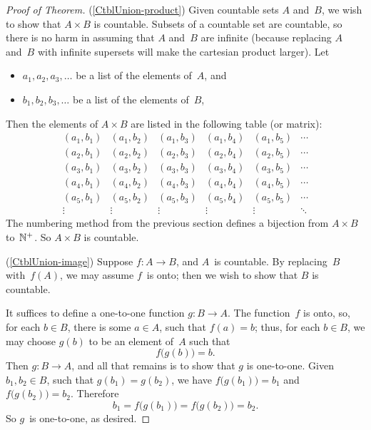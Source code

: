 \documentclass[../MATH-2000-Notes.tex]{subfiles}
\begin{document}
\begin{proof}[Proof of Theorem]
    (\ref{CtblUnion-product}) Given countable sets $A$ and~$B$, we wish to show that $A \times B$ is countable. Subsets of a countable set are countable, so there is no harm in assuming that $A$ and~$B$ are infinite (because replacing $A$ and~$B$ with infinite supersets will make the cartesian product larger). Let
    \begin{itemize}
        \item $a_1,a_2,a_3,\ldots$ be a list of the elements of~$A$,
              and
        \item $b_1,b_2,b_3,\ldots$ be a list of the elements of~$B$,
    \end{itemize}
    Then the elements of $A \times B$ are listed in the following table (or matrix):
    $$\begin{matrix}
            (a_1,b_1) & (a_1,b_2) & (a_1,b_3) & (a_1,b_4) & (a_1,b_5) & \cdots \\
            (a_2,b_1) & (a_2,b_2) & (a_2,b_3) & (a_2,b_4) & (a_2,b_5) & \cdots \\
            (a_3,b_1) & (a_3,b_2) & (a_3,b_3) & (a_3,b_4) & (a_3,b_5) & \cdots \\
            (a_4,b_1) & (a_4,b_2) & (a_4,b_3) & (a_4,b_4) & (a_4,b_5) & \cdots \\
            (a_5,b_1) & (a_5,b_2) & (a_5,b_3) & (a_5,b_4) & (a_5,b_5) & \cdots \\
            \vdots    & \vdots    & \vdots    & \vdots    & \vdots    & \ddots
        \end{matrix}$$
    The numbering method from the previous section defines a bijection from $A \times B$ to~$\mathbb{N}^+$. So $A \times B$ is countable.

    \medskip
    (\ref{CtblUnion-image}) Suppose $f \colon A \to B$, and $A$~is countable. By replacing~$B$ with~$f(A)$, we may assume $f$~is onto; then we wish to show that $B$ is countable.

    It suffices to define a one-to-one function $g \colon B \to A$. The function~$f$ is onto, so, for each $b \in B$, there is some $a \in A$, such that $f(a) = b$; thus, for each $b \in B$, we may choose $g(b)$ to be an element of~$A$ such that
    $$ f \bigl( g(b) \bigr) = b .$$
    Then $g \colon B \to A$, and all that remains is to show that $g$ is one-to-one. Given $b_1,b_2 \in B$, such that $g(b_1) = g(b_2)$, we have $f \bigl( g(b_1) \bigr) = b_1$ and $f \bigl( g(b_2) \bigr) = b_2$. Therefore
    $$ b_1 = f \bigl( g(b_1) \bigr) = f \bigl( g(b_2) \bigr) = b_2 .$$
    So $g$~is one-to-one, as desired.
\end{proof}
\end{document}
